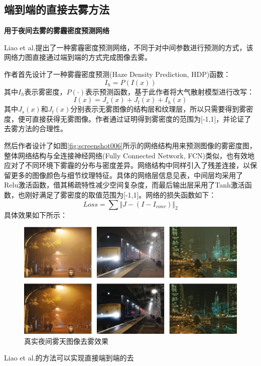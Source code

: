 \begin{multicols}{2}
\subsection{端到端的直接去雾方法}
\noindent\textbf{用于夜间去雾的雾霾密度预测网络}

Liao et al.\cite{22}提出了一种雾霾密度预测网络，不同于\cite{20}对中间参数进行预测的方式，该网络力图直接通过端到端的方式完成图像去雾。

作者首先设计了一种雾霾密度预测(Haze Density Prediction, HDP)函数：
\begin{equation}
	I_h=P(I(x))
\end{equation}
其中$I_h$表示雾密度，$P(·)$表示预测函数，基于此作者将大气散射模型进行改写：
\begin{equation}
	I(x)=J_s(x)+J_t(x)+I_h(x)
\end{equation}
其中$J_s(x)$和$J_t(x)$分别表示无雾图像的结构层和纹理层，所以只需要得到雾密度，便可直接获得无雾图像。作者通过证明得到雾密度的范围为[-1,1]，并论证了去雾方法的合理性。

然后作者设计了如图\ref{fig:screenshot006}所示的网络结构用来预测图像的雾密度图，整体网络结构与全连接神经网络(Fully Connected Network, FCN)类似，也有效地应对了不同环境下雾霾的分布与密度差异。网络结构中同样引入了残差连接，以保留更多的图像颜色与细节纹理特征。具体的网络层信息见表，中间层均采用了Relu激活函数，借其稀疏特性减少空间复杂度，而最后输出层采用了Tanh激活函数，也刚好满足了雾密度的取值范围为[-1,1]。网络的损失函数如下：
\begin{equation}
	Loss=\sum \Vert J-(I-I_{conv}) \Vert_2
\end{equation}
具体效果如下所示：
\begin{figure}[H]
	\centering
	\includegraphics[width=1.0\linewidth]{pics/screenshot013}
	\caption{真实夜间雾天图像去雾效果}
	\label{fig:screenshot013}
\end{figure}


Liao et al.\cite{22}的方法可以实现直接端到端的去
\end{multicols}
